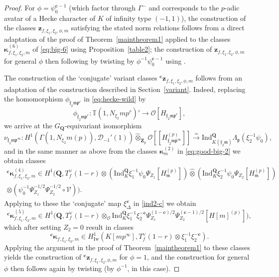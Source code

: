 \documentclass[10pt,letterpaper]{amsart}
\theoremstyle{plain}
\theoremstyle{definition}
\theoremstyle{definition}
\theoremstyle{plain}
\theoremstyle{plain}
\theoremstyle{plain}
\theoremstyle{remark}
\numberwithin{equation}{section}
\newcommand{\cc}{\mathbf{c}}
\newcommand{\ch}{\xi}
\newcommand{\pp}{\mathfrak{p}}
\newcommand{\fkm}{\mathfrak{m}}
\newcommand{\fkmbar}{\overline{\mathfrak{m}}}
\newcommand{\fkf}{\mathfrak{f}}
\def\cO{\mathcal O}
\newcommand{\Q}{\mathbf{Q}}
\newcommand{\Z}{\mathbf{Z}}
\begin{document}
\begin{proof}
For $\phi=\psi_0^{\cc-1}$ (which factor through $\Gamma^-$ and corresponds to the $p$-adic avatar of a Hecke character of $K$ of infinity type $(-1,1)$), the construction of the classes $\mathbf{z}_{f,\xi_1,\xi_2,\phi,m}$ satisfying the stated norm relations follows from a direct adaptation of the proof of Theorem~\ref{maintheorem1} applied to the classes $\boldsymbol{\kappa}_{f,\xi_1,\xi_2,m}^{(6)}$ of \eqref{eq:big-6} using Proposition~\ref{table2}; the construction of $\mathbf{z}_{f,\xi_1,\xi_2,\phi,m}$ for general $\phi$ then following by twisting by $\phi^{-1}\psi_0^{\cc-1}$ using \cite[Thm.~6.3.5]{Rubin-ES}.

The construction of the `conjugate' variant classes  ${}^\cc\mathbf{z}_{f,\xi_1,\xi_2,\phi,m}$ follows from an adaptation of the construction described in Section~\ref{variant}. Indeed, replacing the homomorphism $\phi_{\fkf_2\fkmbar\pp^r}$ in \eqref{eq:hecke-wild} by
\[
\phi_{\fkf_2\fkm\pp^r}:\mathbb{T}(1,N_{\xi_2}mp^r)'\rightarrow\cO[H_{\fkf_2\fkm\pp^r}],
\]
we arrive at the $G_\Q$-equivariant isomorphism
\[
\nu_{\fkf_2\fkm\pp^\infty}:H^1(\Gamma(1,N_{\xi_2}m(p)),\mathcal{D}_{-1}'(1))\hat\otimes_{\Z_p}\cO[\![H_{\fkf_2\fkm\pp^\infty}^{(p)}]\!]\xrightarrow{\simeq}{\mathrm{Ind}}_{K(\fkf_2\fkm)}^\Q\Lambda_\pp(\ch_2^{-1}\psi_0),
\]
and in the same manner as above from the classes $\boldsymbol{\kappa}_m^{(2)}$ in \eqref{eq:good-big-2} we obtain classes
\begin{equation}\label{eq:4-c}
\begin{aligned}
{}^\cc\boldsymbol{\kappa}_{f,\xi_1,\xi_2,m}^{(4)}\in H^1\bigl(\Q,T_f^\vee(1-r)\otimes({\mathrm{Ind}}_K^\Q\xi_1^{-1}\psi_0\Psi_{Z_1}[H_{\fkm}^{(p)}])\hat\otimes({\mathrm{Ind}}_K^\Q\xi_2^{-1}\psi_0\Psi_{Z_2}[H_{\fkm}^{(p)}])\\
\otimes(\psi_0^{-1}\Psi_{Z_1}^{-1/2}\Psi_{Z_2}^{-1/2}\circ\mathscr{V})\bigr).
\end{aligned}
\end{equation}
Applying to these the `conjugate' map $\xi_\Delta^\cc$ in \eqref{ind2-c} we obtain
\[
{}^\cc\boldsymbol{\kappa}_{f,\xi_1,\xi_2,m}^{(5)}\in 
H^1\bigl(\Q,T_f^\vee(1-r)\otimes_\cO{\mathrm{Ind}}_{K}^\Q\xi_1^{-1}\xi_2^{-\cc}\Psi_{Z_1}^{(1-\cc)/2}\Psi_{Z_2}^{(\cc-1)/2}[H[m]^{(p)}]\bigr),
\]
which after setting $Z_2=0$ result in classes
\[
{}^{\cc}\boldsymbol{\kappa}_{f,\xi_1,\xi_2,m}\in H^1_{\mathrm{Iw}}(K[mp^\infty],T_f^\vee(1-r)\otimes\xi_1^{-1}\xi_2^{-\cc}).
\]
Applying the argument in the proof of Theorem~\ref{maintheorem1} to these classes yields the construction of ${}^\cc\mathbf{z}_{f,\xi_1,\xi_2,\phi,m}$ for $\phi=1$, and the construction for general $\phi$ then follows again by twisting (by $\phi^{-1}$, in this case).
\end{proof}
\end{document}
